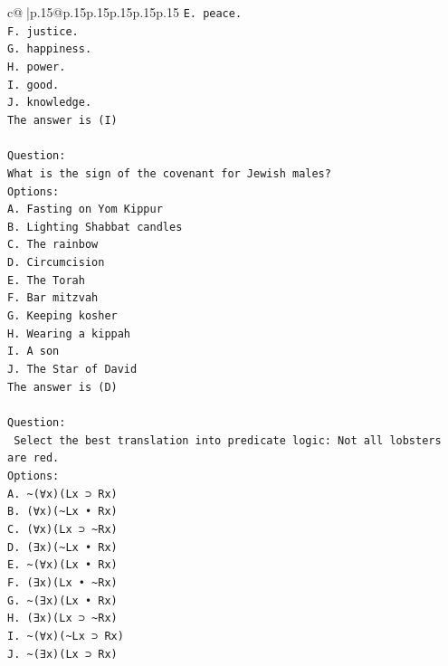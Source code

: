 \documentclass{article}
\begin{document}
{\begin{supertabular}{c@{$\;$}|p{.15\linewidth}@{}p{.15\linewidth}p{.15\linewidth}p{.15\linewidth}p{.15\linewidth}p{.15\linewidth}}
{{{\texttt{E. peace.} \\
\texttt{F. justice.} \\
\texttt{G. happiness.} \\
\texttt{H. power.} \\
\texttt{I. good.} \\
\texttt{J. knowledge.} \\
\texttt{The answer is (I)} \\
\\ 
\texttt{Question:} \\
\texttt{What is the sign of the covenant for Jewish males?} \\
\texttt{Options:} \\
\texttt{A. Fasting on Yom Kippur} \\
\texttt{B. Lighting Shabbat candles} \\
\texttt{C. The rainbow} \\
\texttt{D. Circumcision} \\
\texttt{E. The Torah} \\
\texttt{F. Bar mitzvah} \\
\texttt{G. Keeping kosher} \\
\texttt{H. Wearing a kippah} \\
\texttt{I. A son} \\
\texttt{J. The Star of David} \\
\texttt{The answer is (D)} \\
\\ 
\texttt{Question:} \\
\texttt{ Select the best translation into predicate logic: Not all lobsters are red.} \\
\texttt{Options:} \\
\texttt{A. \textasciitilde{}(∀x)(Lx ⊃ Rx)} \\
\texttt{B. (∀x)(\textasciitilde{}Lx • Rx)} \\
\texttt{C. (∀x)(Lx ⊃ \textasciitilde{}Rx)} \\
\texttt{D. (∃x)(\textasciitilde{}Lx • Rx)} \\
\texttt{E. \textasciitilde{}(∀x)(Lx • Rx)} \\
\texttt{F. (∃x)(Lx • \textasciitilde{}Rx)} \\
\texttt{G. \textasciitilde{}(∃x)(Lx • Rx)} \\
\texttt{H. (∃x)(Lx ⊃ \textasciitilde{}Rx)} \\
\texttt{I. \textasciitilde{}(∀x)(\textasciitilde{}Lx ⊃ Rx)} \\
\texttt{J. \textasciitilde{}(∃x)(Lx ⊃ Rx)} \\
            }
        }
    }
     \\ \\


\end{supertabular}}
\end{document}
